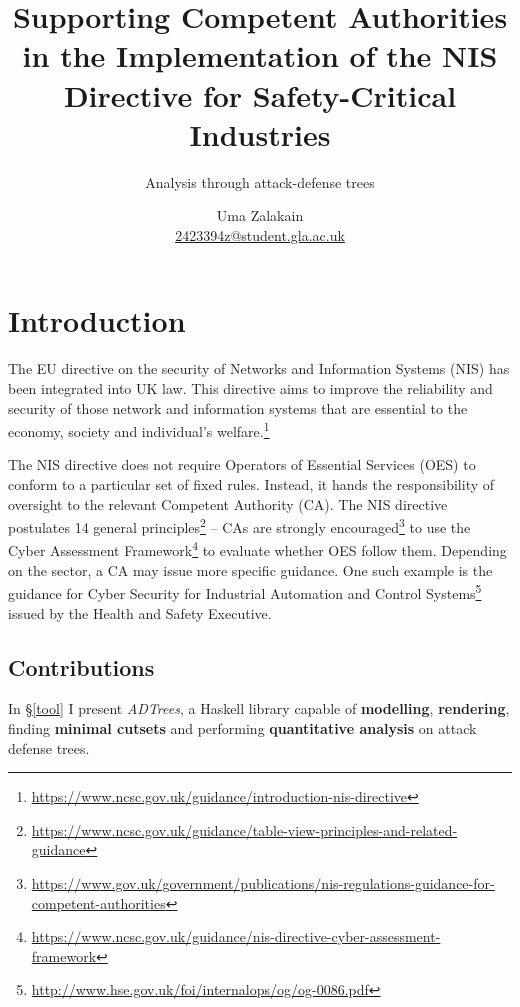 \documentclass{scrreprt}
\begin{document}
\title{Supporting Competent Authorities in the Implementation of the NIS
Directive for Safety-Critical Industries}
\subtitle{Analysis through attack-defense trees}
\author{Uma Zalakain \\ \href{mailto:2423394z@student.gla.ac.uk}{2423394z@student.gla.ac.uk}}

{\let\newpage\relax\maketitle}
\doclicenseThis
\newpage

\setcounter{tocdepth}{2}
\tableofcontents
\newpage
{}

\chapter{Introduction}

The EU directive on the security of Networks and Information Systems (NIS) has
been integrated into UK law. This directive aims to improve the reliability and
security of those network and information systems that are essential to the
economy, society and individual's
welfare.\footnote{\url{https://www.ncsc.gov.uk/guidance/introduction-nis-directive}}

The NIS directive does not require Operators of Essential Services (OES) to
conform to a particular set of fixed rules. Instead, it hands the responsibility
of oversight to the relevant Competent Authority (CA). The NIS directive
postulates 14 general
principles\footnote{\url{https://www.ncsc.gov.uk/guidance/table-view-principles-and-related-guidance}}
-- CAs are strongly
encouraged\footnote{\url{https://www.gov.uk/government/publications/nis-regulations-guidance-for-competent-authorities}}
to use the Cyber Assessment
Framework\footnote{\url{https://www.ncsc.gov.uk/guidance/nis-directive-cyber-assessment-framework}}
to evaluate whether OES follow them. Depending on the sector, a CA may issue
more specific guidance. One such example is the guidance for Cyber Security for
Industrial Automation and Control
Systems\footnote{\url{http://www.hse.gov.uk/foi/internalops/og/og-0086.pdf}}
issued by the Health and Safety Executive.

\section{Contributions}

In \S\ref{tool} I present \textit{ADTrees}, a Haskell library capable of
\textbf{modelling}, \textbf{rendering}, finding \textbf{minimal cutsets} and
performing \textbf{quantitative analysis} on attack defense trees.
\end{document}
